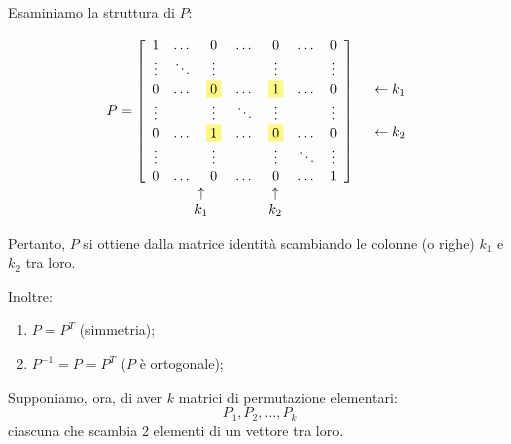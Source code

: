 Esaminiamo la struttura di $P$:

\[
\begin{array}{cc}
P = 
\left[
\begin{array}{ccccccc}
1 & \dots & 0 & \dots & 0 & \dots & 0 \\
\vdots & \ddots & \vdots & & \vdots & & \vdots \\
0 & \dots & \colorbox{yellow!50}{0} & \dots & \colorbox{yellow!50}{1} & \dots & 0 \\
\vdots & & \vdots & \ddots & \vdots & & \vdots \\
0 & \dots & \colorbox{yellow!50}{1} & \dots & \colorbox{yellow!50}{0} & \dots & 0 \\
\vdots & & \vdots & & \vdots & \ddots & \vdots \\
0 & \dots & 0 & \dots & 0 & \dots & 1
\end{array}
\right]
&
\begin{array}{l}
\vphantom{1} \\ \vphantom{\vdots} \\ \leftarrow k_1 \\ \vphantom{\vdots} \\ \leftarrow k_2 \\ \vphantom{\vdots} \\ \vphantom{1}
\end{array}
\\
\begin{array}{ccccccc}
    \phantom{1} & \phantom{\dots00} & \uparrow & \phantom{\dots00} & \uparrow & \phantom{\dots} & \phantom{0} \\
    \phantom{1} & \phantom{\dots00} & k_1 & \phantom{\dots00} & k_2 & \phantom{\dots} & \phantom{0}
    \end{array}
&
\end{array}
\]

Pertanto, $P$ si ottiene dalla matrice identità scambiando le colonne (o righe) $k_1$ e $k_2$ tra loro.

Inoltre:
\begin{enumerate}
    \item $P = P^T$ (simmetria);
    \item $P^{-1} = P = P^T$ ($P$ è ortogonale);
\end{enumerate}

Supponiamo, ora, di aver $k$ matrici di permutazione elementari:
$$ P_1, P_2, \dots, P_k $$
ciascuna che scambia 2 elementi di un vettore tra loro.

